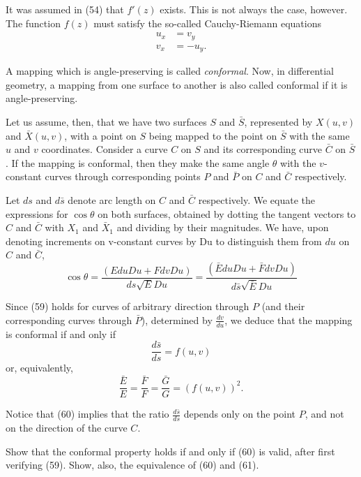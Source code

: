 \documentclass{book}
\begin{document}
It was assumed in (54) that $f'(z)$ exists. This is not always the case, however. The function $f(z)$ must satisfy the so-called Cauchy-Riemann equations
\begin{align}
u_{x} & = v_{y} \\
v_{x} & = - u_{y}.
\end{align}

A mapping which is angle-preserving is called \emph{conformal}. Now, in differential geometry, a mapping from one surface to another is also called conformal if it is angle-preserving.

Let us assume, then, that we have two surfaces $S$ and $\bar{S}$, represented by $X(u,v)$ and $\bar{X}(u,v)$, with a point on $S$ being mapped to the point on $\bar{S}$ with the same $u$ and $v$ coordinates. Consider a curve $C$ on $S$ and its corresponding curve $\bar{C}$ on $\bar{S}$. If the mapping is conformal, then they make the same angle $\theta$ with the $v$-constant curves through corresponding points $P$ and $\bar{P}$ on $C$ and $\bar{C}$ respectively.

Let $ds$ and $d \bar{s}$ denote arc length on $C$ and $\bar{C}$ respectively. We equate the expressions for $\cos \theta$ on both surfaces, obtained by dotting the tangent vectors to $C$ and $\bar{C}$ with $X_{1}$ and $\bar{X}_{1}$ and dividing by their magnitudes. We have, upon denoting increments on v-constant curves by Du to distinguish them from $du$ on $C$ and $\bar{C}$,
\begin{equation}
\cos \theta = \frac{ (E du Du + F dv Du) }{ ds \sqrt{E} Du } = \frac{ (\bar{E} du Du + \bar{F} dv Du) }{ d \bar{s} \sqrt{\bar{E}} Du }
\end{equation}

Since (59) holds for curves of arbitrary direction through $P$ (and their corresponding curves through $\bar{P}$), determined by $\frac{dv}{du}$, we deduce that the mapping is conformal if and only if
\begin{equation}
\frac{d \bar{s}}{ds} = f(u,v)
\end{equation}
or, equivalently,
\begin{equation}
\frac{\bar{E}}{E} = \frac{\bar{F}}{F} = \frac{\bar{G}}{G} = (f(u,v))^{2}.
\end{equation}

Notice that (60) implies that the ratio $\frac{d \bar{s}}{ds}$ depends only on the point $P$, and not on the direction of the curve $C$.

Show that the conformal property holds if and only if (60) is valid, after first verifying (59). Show, also, the equivalence of (60) and (61).
\end{document}
